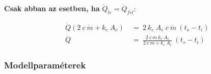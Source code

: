 \textbf{Csak abban az esetben, ha} $\dot Q_{le}=\dot Q_{fel}$:




\begin{equation} \label{holeadas4}
\begin{aligned}
~~~~~~\dot Q (2 ~ c ~ \dot{m} + k_e ~ A_e) & ~=~ 2 ~ k_e ~ A_e ~ c~ \dot{m} ~(t_s-t_i) \\[18pt]
~~~~~~\dot Q &~=~ \frac{2~c~\dot{m}~k_e~A_e}{2 ~c ~ \dot{m} + k_e ~ A_e}~(t_s-t_i)
\end{aligned}
\end{equation}

\subsubsection{Modellparaméterek}












\pagebreak